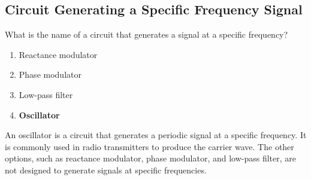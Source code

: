 \subsection{Circuit Generating a Specific Frequency Signal}
\label{T7A05}

\begin{tcolorbox}[colback=gray!10!white,colframe=black!75!black,title=T7A05]
What is the name of a circuit that generates a signal at a specific frequency?
\begin{enumerate}[noitemsep]
    \item Reactance modulator
    \item Phase modulator
    \item Low-pass filter
    \item \textbf{Oscillator}
\end{enumerate}
\end{tcolorbox}

An oscillator is a circuit that generates a periodic signal at a specific frequency. It is commonly used in radio transmitters to produce the carrier wave. The other options, such as reactance modulator, phase modulator, and low-pass filter, are not designed to generate signals at specific frequencies.